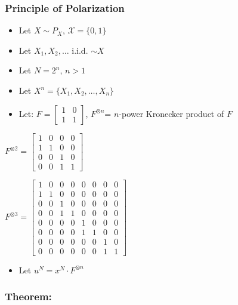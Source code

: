 \documentclass[11pt]{article}
\providecommand{\tightlist}{%
      \setlength{\itemsep}{0pt}\setlength{\parskip}{0pt}}
\begin{document}
\subsubsection{Principle of
Polarization}\label{principle-of-polarization}

\begin{itemize}
\item
  Let \(X \sim P_X\), \(\mathcal{X} = \{0, 1\}\)
\item
  Let \(X_1, X_2, \dots\) i.i.d. \(\sim X\)
\item
  Let \(N = 2^n\), \(n > 1\)
\item
  Let \(X^n = \{X_1, X_2, \dots, X_n\}\)
\item
  Let: \(F = \begin{bmatrix} 1 & 0 \\ 1 & 1 \end{bmatrix}\),
  \(F^{\otimes n}\)= \(n\)-power Kronecker product of \(F\)
\end{itemize}

\(F^{\otimes 2} = \begin{bmatrix} 1 & 0 & 0 & 0 \\ 1 & 1 & 0 & 0 \\ 0 & 0 & 1 & 0 \\ 0 & 0 & 1 & 1 \end{bmatrix}\)

\(F^{\otimes 3} = \begin{bmatrix} 1 & 0 & 0 & 0 & 0 & 0 & 0 & 0 \\ 1 & 1 & 0 & 0 & 0 & 0 & 0 & 0 \\ 0 & 0 & 1 & 0 & 0 & 0 & 0 & 0 \\ 0 & 0 & 1 & 1 & 0 & 0 & 0 & 0 \\ 0 & 0 & 0 & 0 & 1 & 0 & 0 & 0 \\ 0 & 0 & 0 & 0 & 1 & 1 & 0 & 0 \\ 0 & 0 & 0 & 0 & 0 & 0 & 1 & 0 \\ 0 & 0 & 0 & 0 & 0 & 0 & 1 & 1 \end{bmatrix}\)

\begin{itemize}
\tightlist
\item
  Let \(u^N = x^N \cdot F^{\otimes n}\)
\end{itemize}

\subsubsection{Theorem:}\label{theorem}
\end{document}
